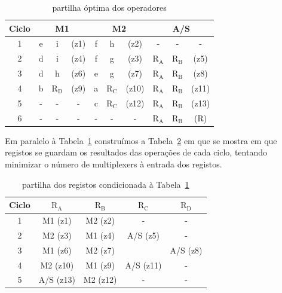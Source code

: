 \documentclass[a4paper]{article}
\begin{document}
\begin{table}[H]
	\centering
	\begin{tabular}{|c||ccc|ccc|ccc|}
		\hline 
		Ciclo & \multicolumn{3}{c|}{M1} & \multicolumn{3}{c|}{M2} & \multicolumn{3}{c|}{A/S} \\ 
		\hline 
		\hline 
		1 & e & i & (z1) & f & h & (z2) & - & - & - \\ 
		\hline 
		2 & d & i & (z4) & f & g & (z3) & $\mathrm{R_A}$ & $\mathrm{R_B}$ & (z5) \\
		\hline 
		3 & d & h & (z6) & e & g & (z7) & $\mathrm{R_A}$ & $\mathrm{R_B}$ & (z8) \\ 
		\hline 
		4 & b & $\mathrm{R_D}$ & (z9) & a & $\mathrm{R_C}$ & (z10) & $\mathrm{R_A}$ & $\mathrm{R_B}$ & (z11) \\ 
		\hline 
		5 & - & - & - & c & $\mathrm{R_C}$ & (z12) & $\mathrm{R_A}$ & $\mathrm{R_B}$ & (z13) \\ 
		\hline 
		6 & - & - & - & - & - & - & $\mathrm{R_A}$ & $\mathrm{R_B}$ & (R) \\ 
		\hline 
	\end{tabular} 
	\caption{partilha óptima dos operadores}
	\label{tab:binding_optim_oper}
\end{table}

Em paralelo à Tabela~\ref{tab:binding_optim_oper} construímos a Tabela~\ref{tab:binding_reg} em que se mostra em que registos se guardam os resultados das operações de cada ciclo, tentando minimizar o número de multiplexers à entrada dos registos.

\begin{table}[H]
	\centering
	\begin{tabular}{|c||c|c|c|c|}
		\hline 
		Ciclo & $\mathrm{R_A}$ & $\mathrm{R_B}$ & $\mathrm{R_C}$ & $\mathrm{R_D}$ \\ 
		\hline 
		\hline
		1 & M1 (z1) & M2 (z2) & - & - \\ 
		\hline 
		2 & M2 (z3) & M1 (z4) & A/S (z5) & - \\ 
		\cline{1-3}\cline{5-5}
		3 & M1 (z6) & M2 (z7) &	 & A/S (z8) \\ 
		\hline 
		4 & M2 (z10) & M1 (z9) & A/S (z11) & - \\ 
		\hline 
		5 & A/S (z13) & M2 (z12) & - & - \\ 
		\hline 
	\end{tabular}
	\caption{partilha dos registos condicionada à Tabela~\ref{tab:binding_optim_oper}}
	\label{tab:binding_reg}
\end{table}
\end{document}
